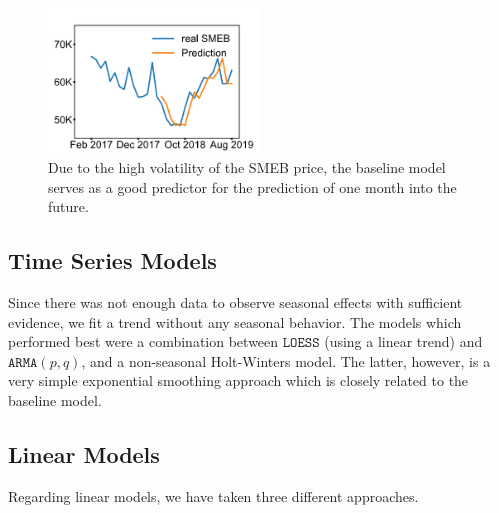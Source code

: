 \documentclass[11pt,a4paper]{article}
\begin{document}
	\begin{figure}[h!]
		\centering
		\includegraphics[width=0.5\textwidth]{image3.png}
		\caption{Due to the high volatility of the SMEB price, the baseline model serves as a good predictor for the prediction of one month into the future.}
		\label{fig:image3}
	\end{figure}

	\subsection*{Time Series Models}
	Since there was not enough data to observe seasonal effects with sufficient evidence, we fit a trend without any seasonal behavior. The models which performed best were a combination between $\mathtt{LOESS}$ (using a linear trend) and $\mathtt{ARMA}(p,q)$, and a non-seasonal Holt-Winters model. The latter, however, is a very simple exponential smoothing approach which is closely related to the baseline model.
	
	\subsection*{Linear Models}
	Regarding linear models, we have taken three different approaches.
	
\end{document}
